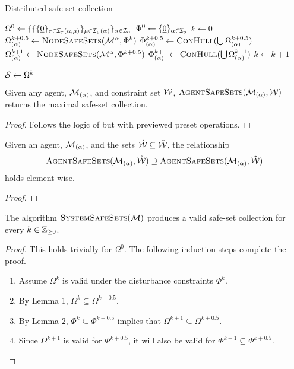 \begin{algorithm}[t]
\caption{Distributed safe-set collection}\label{alg:safe_sets}
\begin{algorithmic}[1]
\State $\Omega^0\gets\{\{\{\underline{0}\}_{\tau\in\mathcal{I}_\tau(\alpha,{\mu})}\}_{{\mu}\in\mathcal{I}_{\mu}(\alpha)}\}_{\alpha\in\mathcal{I}_{\alpha}}$
\State $\Phi^0\gets\{\underline{0}\}_{\alpha\in\mathcal{I}_{\alpha}}$
\State $k\gets0$
\Repeat 
		\State $\Omega^{k+0.5}_{(\agentidx)}\gets\Call{NodeSafeSets}{\modes[\agentidx], \Phi^k}$
		\State $\Phi^{k+0.5}_{(\agentidx)}\gets\Call{ConHull}{\bigcup\Omega^{k+0.5}_{(\agentidx)}}$
	\EndParFor
		\State $\Omega^{k+1}_{(\agentidx)}\gets\Call{NodeSafeSets}{\modes[\agentidx], \Phi^{k+0.5}}$
		\State $\Phi^{k+1}_{(\agentidx)}\gets\Call{ConHull}{\bigcup\Omega^{k+1}_{(\agentidx)}}$
	\EndParFor
	\State $k\gets k+1$

\State $\mathcal{S}\gets\Omega^k$
\EndProcedure
\end{algorithmic}
\end{algorithm}

\begin{lemma}
Given any agent, $\mathcal{M}_{(\alpha)}$, and constraint set $\wcon$, $\Call{AgentSafeSets}{\agent{\agentidx},\wcon}$ returns the maximal safe-set collection.
\end{lemma}
\begin{proof}
Follows the logic of \cite[Theorem 2]{Danielson2019} but with previewed preset operations.
\end{proof}
\begin{lemma}
Given an agent, $\mathcal{M}_{(\alpha)}$, and the sets $\hat\wcon\subseteq\tilde\wcon$, the relationship{\small
$$\Call{AgentSafeSets}{\agent{\agentidx},\hat\wcon}\supseteq\Call{AgentSafeSets}{\agent{\agentidx},\tilde\wcon}$$}
holds element-wise. 
\end{lemma}
\begin{proof}

\end{proof}
\begin{lemma}
The algorithm $\Call{SystemSafeSets}{\agents}$ produces a valid safe-set collection for every $k\in\mathbb{Z}_{\geq 0}$. 
\end{lemma}
\begin{proof}
This holds trivially for $\Omega^0$. The following induction steps complete the proof.
\begin{enumerate}
	\item Assume $\Omega^k$ is valid under the disturbance constraints $\Phi^k$.
	\item By Lemma 1, $\Omega^k\subseteq\Omega^{k+0.5}$.
	\item By Lemma 2, $\Phi^k\subseteq\Phi^{k+0.5}$ implies that $\Omega^{k+1}\subseteq\Omega^{k+0.5}$.
	\item Since $\Omega^{k+1}$ is valid for $\Phi^{k+0.5}$, it will also be valid for $\Phi^{k+1}\subseteq\Phi^{k+0.5}$.
\end{enumerate}
\end{proof}